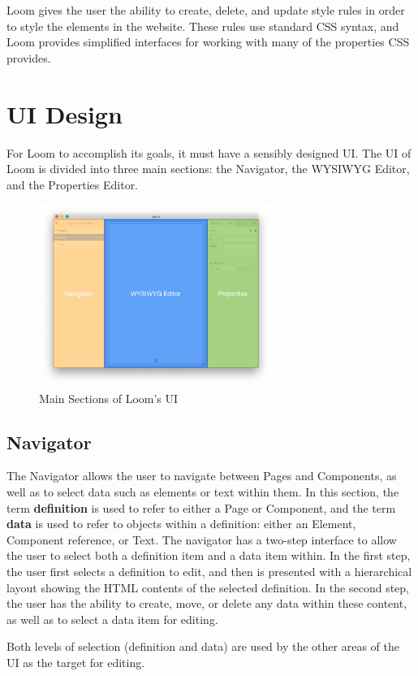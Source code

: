 \documentclass[conference, letterpaper]{IEEEtran}
\begin{document}
Loom gives the user the ability to create, delete, and update style rules in order to style the elements in the website. These rules use standard CSS syntax, and Loom provides simplified interfaces for working with many of the properties CSS provides.

\section{UI Design}
For Loom to accomplish its goals, it must have a sensibly designed UI. The UI of Loom is divided into three main sections: the Navigator, the WYSIWYG Editor, and the Properties Editor.

\begin{figure}[!t]
  \centering
  \includegraphics[width=3in]{../ui_outline.png}
  \caption{Main Sections of Loom's UI}
  \label{fig:uioutline}
\end{figure}

\subsection{Navigator}
The Navigator allows the user to navigate between Pages and Components, as well as to select data such as elements or text within them. In this section, the term \textbf{definition} is used to refer to either a Page or Component, and the term \textbf{data} is used to refer to objects within a definition: either an Element, Component reference, or Text. The navigator has a two-step interface to allow the user to select both a definition item and a data item within. In the first step, the user first selects a definition to edit, and then is presented with a hierarchical layout showing the HTML contents of the selected definition. In the second step, the user has the ability to create, move, or delete any data within these content, as well as to select a data item for editing.

Both levels of selection (definition and data) are used by the other areas of the UI as the target for editing.
\end{document}
